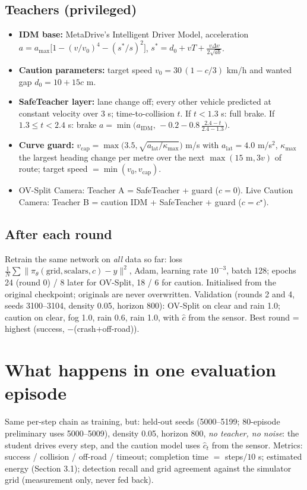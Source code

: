 \documentclass[11pt,a4paper]{article}
\begin{document}
\subsection{Teachers (privileged)}
\begin{itemize}
\item \textbf{IDM base:} MetaDrive's Intelligent Driver Model, acceleration $a=a_{\max}\big[1-(v/v_0)^4-(s^{*}/s)^2\big]$, $s^{*}=d_0+vT+\tfrac{v\Delta v}{2\sqrt{ab}}$.
\item \textbf{Caution parameters:} target speed $v_0=30\,(1-c/3)$ km/h and wanted gap $d_0=10+15c$ m.
\item \textbf{SafeTeacher layer:} lane change off; every other vehicle predicted at constant velocity over 3 s; time-to-collision $t$. If $t<1.3$ s: full brake. If $1.3\le t<2.4$ s: brake $a=\min\!\big(a_{\text{IDM}},\,-0.2-0.8\,\tfrac{2.4-t}{2.4-1.3}\big)$.
\item \textbf{Curve guard:} $v_{\text{cap}}=\max\!\big(3.5,\sqrt{a_{\text{lat}}/\kappa_{\max}}\big)$ m/s with $a_{\text{lat}}=4.0$ m/s$^2$, $\kappa_{\max}$ the largest heading change per metre over the next $\max(15\text{ m},3v)$ of route; target speed $=\min(v_0,v_{\text{cap}})$.
\item OV-Split Camera: Teacher A = SafeTeacher + guard ($c=0$). Live Caution Camera: Teacher B = caution IDM + SafeTeacher + guard ($c=c^{\star}$).
\end{itemize}

\subsection{After each round}
Retrain the same network on \emph{all} data so far: loss $\frac1N\sum\|\pi_\theta(\text{grid},\text{scalars},\hat c)-y\|^2$, Adam, learning rate $10^{-3}$, batch 128; epochs 24 (round 0) / 8 later for OV-Split, 18 / 6 for caution. Initialised from the original checkpoint; originals are never overwritten. Validation (rounds 2 and 4, seeds 3100--3104, density 0.05, horizon 800): OV-Split on clear and rain 1.0; caution on clear, fog 1.0, rain 0.6, rain 1.0, with $\hat c$ from the sensor. Best round = highest (success, $-$(crash+off-road)).

\section{What happens in one evaluation episode}
Same per-step chain as training, but: held-out seeds (5000--5199; 80-episode preliminary uses 5000--5009), density 0.05, horizon 800, \emph{no teacher, no noise}: the student drives every step, and the caution model uses $\hat c_t$ from the sensor. Metrics: success / collision / off-road / timeout; completion time $=$ steps$/10$ s; estimated energy (Section 3.1); detection recall and grid agreement against the simulator grid (measurement only, never fed back).
\end{document}
